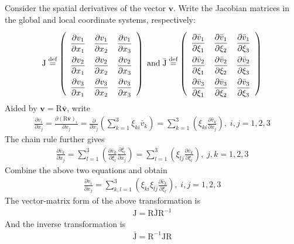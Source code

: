 \documentclass[a4paper,12pt,dvips]{article}
\newcommand*\defeq{\buildrel{\text{def}}\over{=}}
\begin{document}
Consider the spatial derivatives of the vector $\mathbf{v}$.  Write the
Jacobian matrices in the global and local coordinate systems, respectively:
\begin{align*}
  \renewcommand{\arraystretch}{2.2}
  \mathrm{J}
  \defeq \left(\begin{array}{ccc}
    \dfrac{\partial v_1}{\partial x_1} &
    \dfrac{\partial v_1}{\partial x_2} &
    \dfrac{\partial v_1}{\partial x_3} \\
    \dfrac{\partial v_2}{\partial x_1} &
    \dfrac{\partial v_2}{\partial x_2} &
    \dfrac{\partial v_2}{\partial x_3} \\
    \dfrac{\partial v_3}{\partial x_1} &
    \dfrac{\partial v_3}{\partial x_2} &
    \dfrac{\partial v_3}{\partial x_3}
  \end{array}\right)
  \; \mbox{and} \;
  \bar{\mathrm{J}}
  \defeq \left(\begin{array}{ccc}
    \dfrac{\partial \bar{v}_1}{\partial\xi_1} &
    \dfrac{\partial \bar{v}_1}{\partial\xi_2} &
    \dfrac{\partial \bar{v}_1}{\partial\xi_3} \\
    \dfrac{\partial \bar{v}_2}{\partial\xi_1} &
    \dfrac{\partial \bar{v}_2}{\partial\xi_2} &
    \dfrac{\partial \bar{v}_2}{\partial\xi_3} \\
    \dfrac{\partial \bar{v}_3}{\partial\xi_1} &
    \dfrac{\partial \bar{v}_3}{\partial\xi_2} &
    \dfrac{\partial \bar{v}_3}{\partial\xi_3}
  \end{array}\right)
\end{align*}
Aided by $\mathbf{v} = \mathrm{R}\bar{\mathbf{v}}$, write
\begin{align*}
  \frac{\partial v_i}{\partial x_j}
  = \frac{\partial (\mathrm{R}\bar{\mathbf{v}})_i}{\partial x_j}
  = \frac{\partial}{\partial x_j}
    \left( \sum_{k=1}^3 \xi_{ki}\bar{v}_k \right)
  = \sum_{k=1}^3
    \left( \xi_{ki} \frac{\partial \bar{v}_k}{\partial x_j} \right),
  \; i,j = 1, 2, 3
\end{align*}
The chain rule further gives
\begin{align*}
  \frac{\partial \bar{v}_k}{\partial x_j}
  = \sum_{l=1}^3
    \left(
      \frac{\partial \bar{v}_k}{\partial \xi_l}
      \frac{\partial \xi_l}{\partial x_j}
    \right)
  = \sum_{l=1}^3
    \left( \xi_{lj} \frac{\partial \bar{v}_k}{\partial \xi_l} \right),
  \; j,k = 1, 2, 3
\end{align*}
Combine the above two equations and obtain
\begin{align*}
  \frac{\partial v_i}{\partial x_j}
  = \sum_{k,l=1}^3
    \left(
      \xi_{ki} \xi_{lj} \frac{\partial \bar{v}_k}{\partial \xi_l}
    \right),
  \; i,j = 1, 2, 3
\end{align*}
The vector-matrix form of the above transformation is
\begin{align*}
  \mathrm{J} = \mathrm{R\bar{J}R^{-1}}
\end{align*}
And the inverse transformation is
\begin{align*}
  \bar{\mathrm{J}} = \mathrm{R^{-1}JR}
\end{align*}
\end{document}
